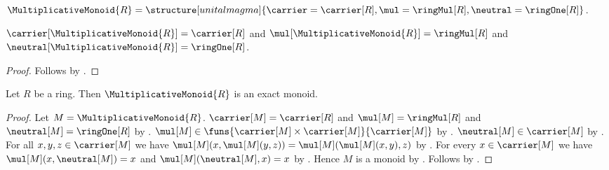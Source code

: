 \begin{definition}\label{spike_multiplicative_monoid}
    $\MultiplicativeMonoid{R}=
        \structure[unital magma]{
            \carrier=\carrier[R],
            \mul=\ringMul[R],
            \neutral=\ringOne[R]
        }$.
\end{definition}

\begin{proposition}\label{spike_multiplicative_monoid_fields}
    $\carrier[\MultiplicativeMonoid{R}]=\carrier[R]$ and
    $\mul[\MultiplicativeMonoid{R}]=\ringMul[R]$ and
    $\neutral[\MultiplicativeMonoid{R}]=\ringOne[R]$.
\end{proposition}
\begin{proof}
    Follows by
        .
\end{proof}

\begin{proposition}\label{spike_multiplicative_monoid_is_exact}
    Let $R$ be a ring.
    Then $\MultiplicativeMonoid{R}$ is an exact monoid.
\end{proposition}
\begin{proof}
    Let $M=\MultiplicativeMonoid{R}$.
    $\carrier[M]=\carrier[R]$ and $\mul[M]=\ringMul[R]$ and
        $\neutral[M]=\ringOne[R]$ by
        .
    $\mul[M]\in\funs{\carrier[M]\times\carrier[M]}{\carrier[M]}$ by
        .
    $\neutral[M]\in\carrier[M]$ by .
    For all $x,y,z\in\carrier[M]$ we have
        $\mul[M](x,\mul[M](y,z))=\mul[M](\mul[M](x,y),z)$ by
        .
    For every $x\in\carrier[M]$ we have
        $\mul[M](x,\neutral[M])=x$ and
        $\mul[M](\neutral[M],x)=x$ by
        .
    Hence $M$ is a monoid by
        .
    Follows by
        .
\end{proof}
